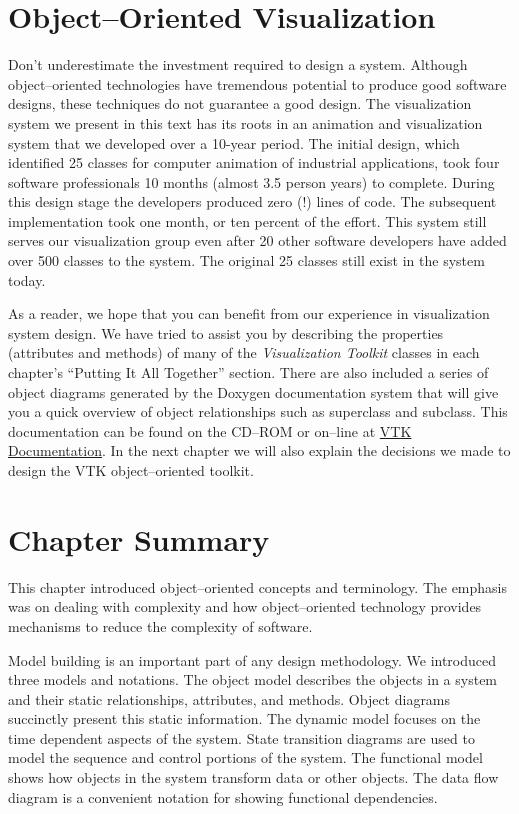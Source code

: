 \section{Object--Oriented Visualization}

Don't underestimate the investment required to design a system. Although object--oriented technologies have tremendous potential to produce good software designs, these techniques do not guarantee a good design. The visualization system we present in this text has its roots in an animation \cite{Lorensen89} and visualization system \cite{Schroeder92} that we developed over a 10-year period. The initial design, which identified 25 classes for computer animation of industrial applications, took four software professionals 10 months (almost 3.5 person years) to complete. During this design stage the developers produced zero (!) lines of code. The subsequent implementation took one month, or ten percent of the effort. This system still serves our visualization group even after 20 other software developers have added over 500 classes to the system. The original 25 classes still exist in the system today.

As a reader, we hope that you can benefit from our experience in visualization system design. We have tried to assist you by describing the properties (attributes and methods) of many of the \emph{Visualization Toolkit} classes in each chapter's ``Putting It All Together'' section. There are also included a series of object diagrams generated by the Doxygen documentation system that will give you a quick overview of object relationships such as superclass and subclass. This documentation can be found on the CD--ROM or on--line at \href{https://www.vtk.org/doc/nightly/html/index.html}{VTK Documentation}. In the next chapter we will also explain the decisions we made to design the VTK object--oriented toolkit.

\section{Chapter Summary}

This chapter introduced object--oriented concepts and terminology. The emphasis was on dealing with complexity and how object--oriented technology provides mechanisms to reduce the complexity of software.

Model building is an important part of any design methodology. We introduced three models and notations. The object model describes the objects in a system and their static relationships, attributes, and methods. Object diagrams succinctly present this static information. The dynamic model focuses on the time dependent aspects of the system. State transition diagrams are used to model the sequence and control portions of the system. The functional model shows how objects in the system transform data or other objects. The data flow diagram is a convenient notation for showing functional dependencies.

